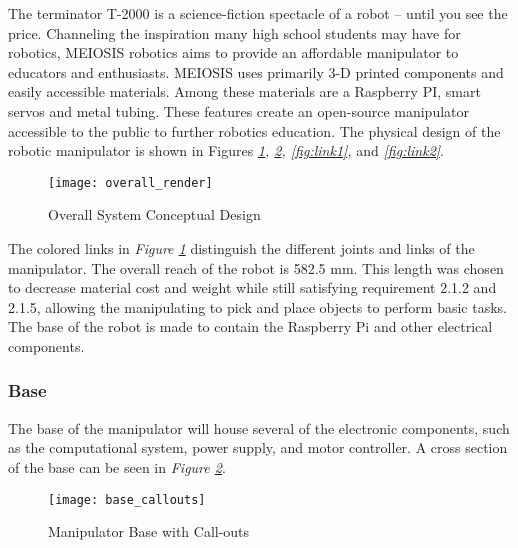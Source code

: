 The terminator T-2000 is a science-fiction spectacle of a robot -- until you see the price. Channeling the inspiration many high school students may have for robotics, MEIOSIS robotics aims to provide an affordable manipulator to educators and enthusiasts. MEIOSIS uses primarily 3-D printed components and easily accessible materials. Among these materials are a Raspberry PI, smart servos and metal tubing. These features create an open-source manipulator accessible to the public to further robotics education.
The physical design of the robotic manipulator is shown in Figures \emph{\ref{fig:overall}, \ref{fig:base}, \ref{fig:link1},} and \emph{\ref{fig:link2}}.

\begin{figure}[htp]
  \centering
  \texttt{[image: overall\_render]}
  \caption{Overall System Conceptual Design }
  \label{fig:overall}
\end{figure}

The colored links in \emph{Figure \ref{fig:overall}} distinguish the different joints and links of the manipulator. The overall reach of the robot is 582.5 mm. This length was chosen to decrease material cost and weight while still satisfying requirement 2.1.2 and 2.1.5, allowing the manipulating to pick and place objects to perform basic tasks. The base of the robot is made to contain the Raspberry Pi and other electrical components.

\subsubsection{Base}
The base of the manipulator will house several of the electronic components, such as the computational system, power supply, and motor controller. A cross section of the base can be seen in \emph{Figure \ref{fig:base}}.
\begin{figure}[htp]
  \centering
  \texttt{[image: base\_callouts]}
  \caption{Manipulator Base with Call-outs}
  \label{fig:base}
\end{figure}

